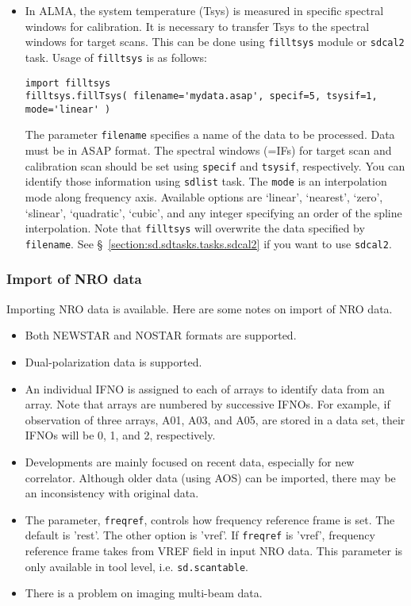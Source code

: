 \begin{itemize}
\item In ALMA, the system temperature (Tsys) is measured in specific
spectral windows for calibration. It is necessary to transfer Tsys to
the spectral windows for target scans. This can be done using {\tt filltsys}
module or {\tt sdcal2} task. Usage of {\tt filltsys} is as follows:
\begin{verbatim}
import filltsys
filltsys.fillTsys( filename='mydata.asap', specif=5, tsysif=1, mode='linear' )
\end{verbatim}
The parameter {\tt filename} specifies a name of the data to be
processed. Data must be in ASAP format. The spectral windows (=IFs) for
target scan and calibration scan should be set using {\tt specif} and
{\tt tsysif}, respectively. You can identify those information using
{\tt sdlist} task. The {\tt mode} is an interpolation mode along
frequency axis. Available options are \lq linear\rq, \lq nearest\rq, 
\lq zero\rq, \lq slinear\rq, \lq quadratic\rq, \lq cubic\rq, 
and any integer specifying an order of the spline interpolation.
Note that {\tt filltsys} will overwrite the data specified by
{\tt filename}. 
See \S~\ref{section:sd.sdtasks.tasks.sdcal2} if you want to use {\tt sdcal2}.
\end{itemize}

\subsubsection{Import of NRO data}

Importing NRO data is available. Here are some notes on import of NRO data.

\begin{itemize}
\item Both NEWSTAR and NOSTAR formats are supported.
\item Dual-polarization data is supported.
\item An individual IFNO is assigned to each of arrays to identify 
data from an array. Note that arrays are numbered by successive IFNOs. 
For example, if observation of three arrays, A01, A03, and A05, 
are stored in a data set, their IFNOs will be 0, 1, and 2, respectively.
\item Developments are mainly focused on recent data, especially for new correlator.
Although older data (using AOS) can be imported, there may be an inconsistency with original data.
\item The parameter, {\tt freqref}, controls how frequency reference frame is set. 
The default is 'rest'. The other option is 'vref'. 
If {\tt freqref} is 'vref', frequency reference frame takes 
from VREF field in input NRO data. 
This parameter is only available in tool level, i.e. {\tt sd.scantable}.
\item There is a problem on imaging multi-beam data. 
\end{itemize}


